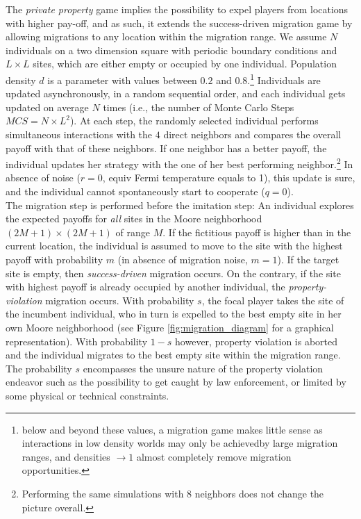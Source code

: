The {\it private property} game implies the possibility to expel players from locations with higher pay-off, and as such, it extends the success-driven migration game by allowing migrations to any location within the migration range. We assume $N$ individuals on a two dimension square with periodic boundary conditions and $L\times L$ sites, which are either empty or occupied by one individual. Population density $d$ is a parameter with values between $0.2$ and $0.8$.\footnote{below and beyond these values, a migration game makes little sense as interactions in low density worlds may only be achievedby large migration ranges, and densities $\rightarrow 1$ almost completely remove migration opportunities.} Individuals are updated asynchronously, in a random sequential order, and each individual gets updated on average $N$ times (i.e., the number of Monte Carlo Steps $MCS = N \times L^2$). At each step, the randomly selected individual performs simultaneous interactions with the $4$ direct neighbors and compares the overall payoff with that of these neighbors. If one neighbor has a better payoff, the individual updates her strategy with the one of her best performing neighbor.\footnote{Performing the same simulations with 8 neighbors does not change the picture overall.} In absence of noise ($r=0$, equiv Fermi temperature equals to 1), this update is sure, and the individual cannot spontaneously start to cooperate ($q=0$).\\

The migration step is performed before the imitation step\cite{helbing2009outbreak}: An individual explores the expected payoffs for {\it all} sites in the Moore neighborhood $(2M + 1) \times (2M + 1)$ of range $M$. If the fictitious payoff is higher than in the current location, the individual is assumed to move to the site with the highest payoff with probability $m$ (in absence of migration noise, $m=1$). If the target site is empty, then {\it success-driven} migration occurs. On the contrary, if the site with highest payoff is already occupied by another individual, the {\it property-violation} migration occurs. With probability $s$, the focal player takes the site of the incumbent individual, who in turn is expelled to the best empty site in her own Moore neighborhood (see Figure \ref{fig:migration_diagram} for a graphical representation). With probability $1-s$ however, property violation is aborted and the individual migrates to the best empty site within the migration range. The probability $s$ encompasses the unsure nature of the property violation endeavor such as the possibility to get caught by law enforcement, or limited by some physical or technical constraints. \\
 

